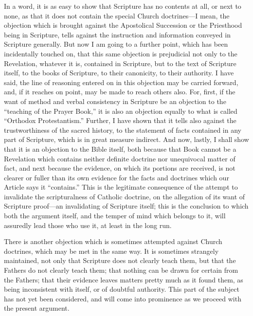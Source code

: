 In a word, it is as easy to show that Scripture has no contents at
all, or next to none, as that it does not contain the special Church
doctrines—I mean, the objection which is brought against the
Apostolical Succession or the Priesthood being in Scripture, tells
against the instruction and information conveyed in Scripture
generally. But now I am going to a further point, which has been
incidentally touched on, that this same objection is prejudicial not
only to the Revelation, whatever it is, contained in Scripture, but to
the text of Scripture itself, to the books of Scripture, to their
canonicity, to their authority. I have said, the line of reasoning
entered on in this objection may be carried forward, and, if it
reaches on point, may be made to reach others also. For, first, if the
want of method and verbal consistency in Scripture be an objection to
the ``teaching of the Prayer Book,'' it is also an objection
equally to what is called ``Orthodox Protestantism.'' Further,
I have shown that it tells also against the trustworthiness of the
sacred history, to the statement of facts contained in any part of
Scripture, which is in great measure indirect. And now, lastly, I
shall show that it is an objection to the Bible itself, both because
that Book cannot be a Revelation which contains neither definite
doctrine nor unequivocal matter of fact, and next because the
evidence, on which its portions are received, is not clearer or fuller
than its own evidence for the facts and doctrines which our Article
says it ``contains.'' This is the legitimate consequence of
the attempt to invalidate the scripturalness of Catholic doctrine, on
the allegation of its want of Scripture proof—an invalidating
of Scripture itself; this is the conclusion to which both the argument
itself, and the temper of mind which belongs to it, will assuredly
lead those who use it, at least in the long run.

There is another objection which is sometimes attempted against
Church doctrines, which may be met in the same way. It is sometimes
strangely maintained, not only that Scripture does not clearly teach
them, but that the Fathers do not clearly teach them; that nothing can
be drawn for certain from the Fathers; that their evidence leaves
matters pretty much as it found them, as being inconsistent with
itself, or of doubtful authority. This part of the subject has not yet
been considered, and will come into prominence as we proceed with the
present argument.

